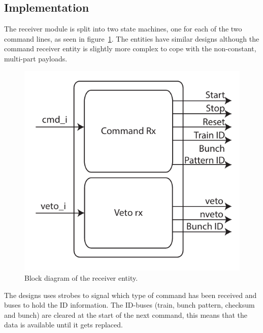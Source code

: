 \subsection{Implementation} %
\label{sub:rx_implementation}
The receiver module is split into two state machines, one for each of the two command lines, as seen in figure~\ref{fig:rx_entity}. The entities have similar designs although the command receiver entity is slightly more complex to cope with the non-constant, multi-part payloads. 
\begin{figure}[htbp] 
  \centering
  \includegraphics[scale=1]{images/pdfs/rx_block.pdf}
  \caption{Block diagram of the receiver entity.}
  \label{fig:rx_entity}
\end{figure}
  
The designs uses strobes to signal which type of command has been received and buses to hold the ID information. The ID-buses (train, bunch pattern, checksum and bunch) are cleared at the start of the next command, this means that the data is available until it gets replaced.
  
